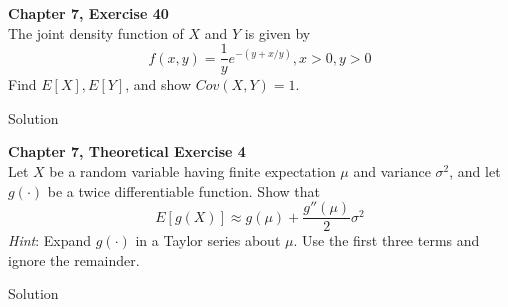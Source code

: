 \documentclass{article}
\begin{document}
\begin{spacing}{1.1}
\newpage
\begin{homeworkProblem}
  {\bf Chapter 7, Exercise 40}\\
  The joint density function of $X$ and $Y$ is given by
    \[f( x, y) = \frac{ 1}{ y} e^{-(y + x / y)}, x > 0, y > 0\]
  Find $E[ X], E[ Y]$, and show $Cov( X, Y) = 1$.
  \begin{homeworkSection}{Solution}
    
  \end{homeworkSection}
\end{homeworkProblem}

\newpage
\begin{homeworkProblem}
  {\bf Chapter 7, Theoretical Exercise 4}\\
  Let $X$ be a random variable having finite expectation $\mu$ and 
  variance $\sigma^2$, and let $g(\cdot)$ be a twice differentiable function. 
  Show that
  \[E[ g( X)] \approx g( \mu) + \frac{ g''(\mu)}{ 2} \sigma^2\]
  \emph{Hint}: Expand $g(\cdot)$ in a Taylor series about $\mu$. Use the 
  first three terms and ignore the remainder.
  \begin{homeworkSection}{Solution}
    
  \end{homeworkSection}
\end{homeworkProblem}
  
\end{spacing}
\end{document}

